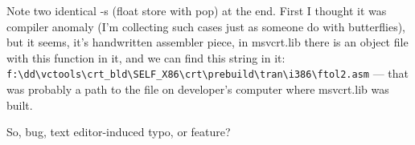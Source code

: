 Note two identical -s (float store with pop) at the end. 
First I thought it was compiler anomaly (I'm collecting such cases just as someone do with butterflies),
but it seems, it's handwritten assembler piece, in msvcrt.lib there is an object file with this function in it,
and we can find this string in it:\\
\verb|f:\dd\vctools\crt_bld\SELF_X86\crt\prebuild\tran\i386\ftol2.asm| ---
that was probably a path to the file on developer's computer where msvcrt.lib was built.

So, bug, text editor-induced typo, or feature?

